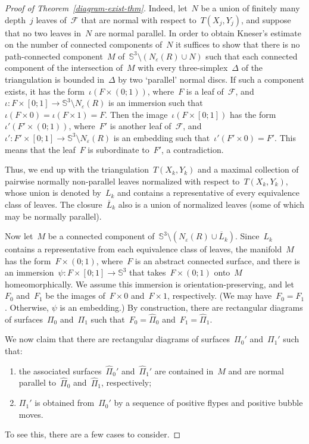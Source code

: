\documentclass{amsart}
\theoremstyle{theorem}
\theoremstyle{remark}
\theoremstyle{definition}
\numberwithin{equation}{section}
\numberwithin{figure}{section}
\begin{document}
\begin{proof}[Proof of Theorem~\ref{diagram-exist-thm}]
Indeed, let~$N$ be a union of finitely many depth~$j$ leaves of~$\mathscr F$ that are normal with respect to~$T(X_j,Y_j)$,
and suppose that no two leaves in~$N$ are normal parallel. In order to obtain Kneser's estimate on the number
of connected components of~$N$ it suffices to show that there is no path-connected
component~$M$ of~$\mathbb S^3\setminus(N_\varepsilon(R)\cup N)$ such that each connected component of the intersection of~$M$
with every three-simplex~$\Delta$ of the triangulation is bounded in~$\Delta$ by two `parallel' normal discs.
If such a component exists, it has the form~$\iota(F\times(0;1))$, where~$F$ is a leaf of~$\mathscr F$,
and~$\iota:F\times[0;1]\rightarrow\mathbb S^3\setminus N_\varepsilon(R)$ is an immersion such that~$\iota(F\times0)=
\iota(F\times1)=F$. Then the image~$\iota(F\times[0;1])$ has the form~$\iota'(F'\times(0;1))$, where~$F'$
is another leaf of~$\mathscr F$, and~$\iota':F'\times[0;1]\rightarrow\mathbb S^3\setminus N_\varepsilon(R)$
is an embedding such that~$\iota'(F'\times0)=F'$. This means that the leaf~$F$ is subordinate to~$F'$, a contradiction.

Thus, we end up with the triangulation~$T(X_k,Y_k)$ and a maximal collection of pairwise normally non-parallel leaves
normalized with respect to~$T(X_k,Y_k)$, whose union is denoted by~$L_k$ and contains a representative of
every equivalence class of leaves. The closure~$\overline L_k$ also is a union of normalized leaves
(some of which may be normally parallel).

Now let~$M$ be a connected component of~$\mathbb S^3\setminus(N_\varepsilon(R)\cup\overline L_k)$.
Since~$L_k$ contains a representative from each equivalence class of leaves, the manifold~$M$
has the form~$F\times(0;1)$, where~$F$ is an abstract connected surface, and there is an immersion~$\psi:F\times[0;1]\rightarrow\mathbb
S^3$ that takes~$F\times(0;1)$ onto~$M$ homeomorphically. We assume this immersion is orientation-preserving,
and let~$F_0$ and~$F_1$ be the images of~$F\times0$ and~$F\times1$, respectively. (We may have~$F_0=F_1$.
Otherwise, $\psi$ is an embedding.) By construction, there are rectangular diagrams
of surfaces~$\Pi_0$ and~$\Pi_1$ such that~$F_0=\widehat\Pi_0$ and~$F_1=\widehat\Pi_1$.

We now claim that there are rectangular diagrams of surfaces~$\Pi_0'$ and~$\Pi_1'$ such
that:
\begin{enumerate}
\item
the associated surfaces~$\widehat\Pi_0'$ and~$\widehat\Pi_1'$ are contained in~$M$
and are normal parallel to~$\widehat\Pi_0$ and~$\widehat\Pi_1$,
respectively;
\item
$\Pi_1'$ is obtained from~$\Pi_0'$
by a sequence of positive flypes and positive bubble moves.
\end{enumerate}
To see this, there are a few cases to consider.


\end{proof}
\end{document}
